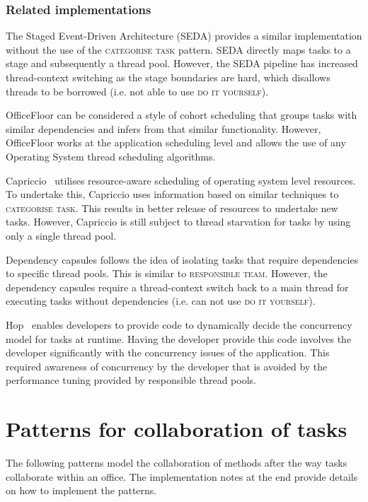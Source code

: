 \documentclass[prodmode]{style/acmlarge}
\begin{document}
\subsubsection*{Related implementations}

The Staged Event-Driven Architecture (SEDA) \cite{seda} provides a similar
implementation without the use of the \textsc{categorise task} pattern.
SEDA directly maps tasks to a stage and subsequently a thread pool.
However, the SEDA pipeline has increased thread-context switching as the stage
boundaries are hard, which disallows threads to be borrowed (i.e. not able to
use \textsc{do it yourself}).

OfficeFloor can be considered a style of cohort scheduling \cite{cohort}
that groups tasks with similar dependencies and infers from that similar
functionality.  However, OfficeFloor works at the application scheduling
level and allows the use of any Operating System thread scheduling algorithms.

Capriccio~\cite{capriccio} utilises resource-aware scheduling of operating
system level resources.  To undertake this, Capriccio uses information based on
similar techniques to \textsc{categorise task}.  This results in better release
of resources to undertake new tasks.  However, Capriccio is still subject to
thread starvation for tasks by using only a single thread pool.

Dependency capsules \cite{dependency-capsules} follows the idea of isolating
tasks that require dependencies to specific thread pools.  This is similar to
\textsc{responsible team}.  However, the dependency capsules require a
thread-context switch back to a main thread for executing tasks without
dependencies (i.e. can not use \textsc{do it yourself}).

Hop~\cite{hop} enables developers to provide code to dynamically decide the
concurrency model for tasks at runtime.  Having the developer provide this code
involves the developer significantly with the concurrency issues of the
application.  This required awareness of concurrency by the developer that is
avoided by the performance tuning provided by responsible thread pools.



\section{Patterns for collaboration of tasks}

The following patterns model the collaboration of methods after the way tasks
collaborate within an office.  The implementation notes at the end provide
details on how to implement the patterns.
\end{document}
